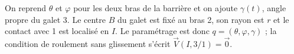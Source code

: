 \begin{corrigebox}
On reprend $\theta$ et $\varphi$ pour les deux bras de la barrière et on
ajoute $\gamma(t)$, angle propre du galet 3. Le centre $B$ du galet est fixé
au bras 2, son rayon est $r$ et le contact avec 1 est localisé en $I$.
Le paramétrage est donc $q=(\theta,\varphi,\gamma)$ ; la condition de
roulement sans glissement s'écrit $\vec V(I,3/1)=\vec0$.
\end{corrigebox}
